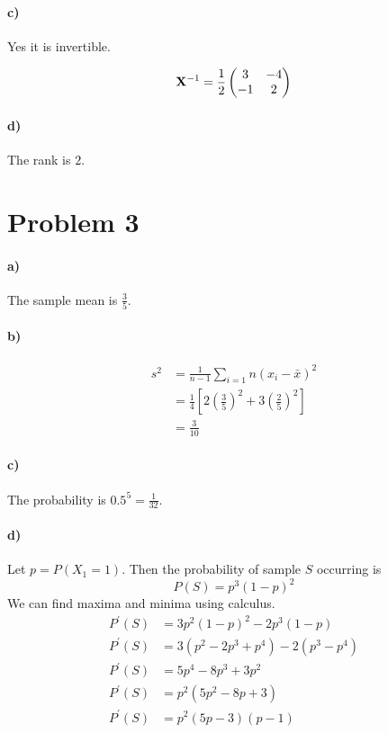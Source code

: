 \documentclass[12pt]{article}
\begin{document}
\paragraph{c)}

Yes it is invertible.

\[\mathbf{X}^{-1}=\frac{1}{2}\left(
        \begin{array}{@{}cc@{}}
                3&-4\\
                -1&2
        \end{array}
\right)\]

\paragraph{d)}

The rank is \(2\).

\section*{Problem 3}

\paragraph{a)}

The sample mean is \(\frac{3}{5}\).

\paragraph{b)}

\begin{align*}
        s^2&=\frac{1}{n-1}\sum_{i=1}{n}(x_i-\bar{x})^2\\
        &=\frac{1}{4}\left[2\left(\frac{3}{5}\right)^2+3\left(\frac{2}{5}\right)^2\right]\\
        &=\frac{3}{10}
\end{align*}

\paragraph{c)}

The probability is \(0.5^5=\frac{1}{32}\).

\paragraph{d)}

Let \(p=P\left(X_1=1\right)\). Then the probability of sample \(S\) occurring is
\[P(S)=p^3(1-p)^2\]
We can find maxima and minima using calculus.
\begin{align*}
        P^\prime(S)&=3p^2(1-p)^2-2p^3(1-p)\\
        P^\prime(S)&=3(p^2-2p^3+p^4)-2(p^3-p^4)\\
        P^\prime(S)&=5p^4-8p^3+3p^2\\
        P^\prime(S)&=p^2(5p^2-8p+3)\\
        P^\prime(S)&=p^2(5p-3)(p-1)
\end{align*}
\end{document}
